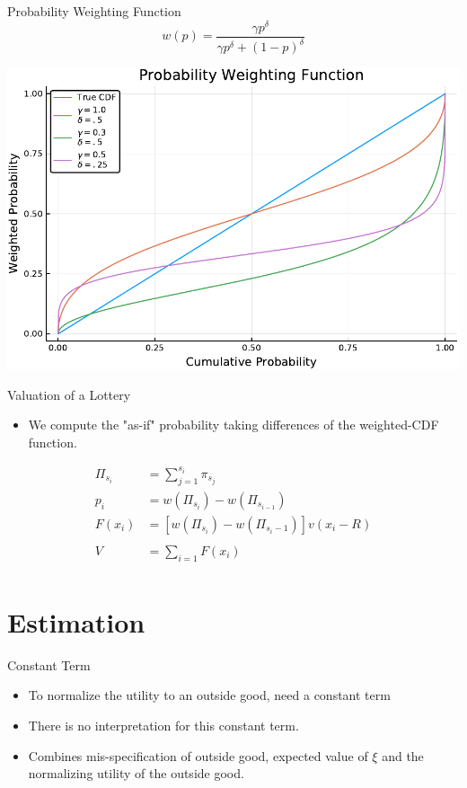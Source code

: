 \documentclass[presentation]{beamer}
\begin{document}
\begin{frame}[label={sec:org792a9d5}]{Probability Weighting Function}
\begin{equation*}
  w(p) = \frac{\gamma p^{\delta}}{\gamma p^{\delta} + (1-p)^{\delta}}
\end{equation*}

\begin{center}
\includegraphics[width=.75\linewidth]{../Plots/WeightFun.pdf}
\end{center}
\end{frame}


\begin{frame}[label={sec:org75f7df5}]{Valuation of a Lottery}
\begin{itemize}
\item We compute the "as-if" probability taking differences of the
weighted-CDF function.
\end{itemize}
\begin{align*}
  \Pi_{s_i} &= \sum_{j=1}^{s_i} \pi_{s_j}\\
  p_i &= w( \Pi_{s_i}) - w(\Pi_{s_{i-1}})\\
  F(x_i) &= \left[  w( \Pi_{s_i}) - w(\Pi_{s_i - 1}) \right] v( x_i - R)\\
  \\
  V &= \sum_{i=1} F(x_i)\\            
\end{align*}
\end{frame}
\section{Estimation}
\label{sec:org85a7521}
\begin{frame}[label={sec:orgf234887}]{Constant Term}
\begin{itemize}
\item To normalize the utility to an outside good, need a constant term
\item There is no interpretation for this constant term.
\item Combines mis-specification of outside good, expected value of \(\xi\)
and the normalizing utility of the outside good.
\end{itemize}
\end{frame}
\end{document}
